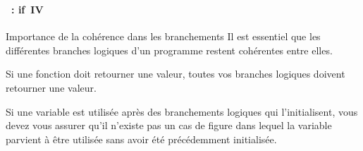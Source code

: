 \begin{frame}
  \frametitle{\secname}
  \framesubtitle{\subsecname~: if~IV}

  \begin{alertblock}{Importance de la cohérence dans les branchements}
    Il est essentiel que les différentes branches logiques d'un programme restent cohérentes entre elles.
    \vspace{0.3cm}
    \par
    Si une fonction doit retourner une valeur, toutes vos branches logiques doivent retourner une valeur.
    \vspace{0.3cm}
    \par
    Si une variable est utilisée après des branchements logiques qui l'initialisent, vous devez vous assurer qu'il n'existe pas un cas de figure dans 
    lequel la variable parvient à être utilisée sans avoir été précédemment initialisée.
  \end{alertblock}

\end{frame}

